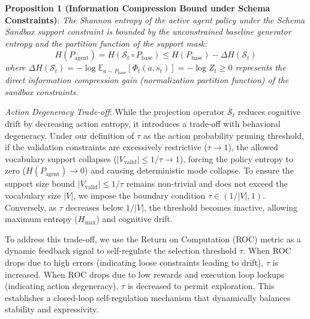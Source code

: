 \documentclass[10pt,journal,compsoc]{IEEEtran}
\begin{document}
\textbf{Proposition 1 (Information Compression Bound under Schema Constraints)}: \textit{The Shannon entropy of the active agent policy under the Schema Sandbox support constraint is bounded by the unconstrained baseline generator entropy and the partition function of the support mask:}
\begin{equation}
H(P_{\text{agent}}) = H(\mathcal{S}_t \circ P_{\text{base}}) \le H(P_{\text{base}}) - \Delta H(\mathcal{S}_t)
\end{equation}
\textit{where $\Delta H(\mathcal{S}_t) = -\log \mathbb{E}_{a \sim P_{\text{base}}}[\Phi_t(a, s_t)] = -\log Z_t \ge 0$ represents the direct information compression gain (normalization partition function) of the sandbox constraints.}

\textit{Action Degeneracy Trade-off}: While the projection operator $\mathcal{S}_t$ reduces cognitive drift by decreasing action entropy, it introduces a trade-off with behavioral degeneracy. Under our definition of $\tau$ as the action probability pruning threshold, if the validation constraints are excessively restrictive ($\tau \to 1$), the allowed vocabulary support collapses ($|V_{\text{valid}}| \le 1/\tau \to 1$), forcing the policy entropy to zero ($H(P_{\text{agent}}) \to 0$) and causing deterministic mode collapse. To ensure the support size bound $|V_{\text{valid}}| \le 1/\tau$ remains non-trivial and does not exceed the vocabulary size $|V|$, we impose the boundary condition $\tau \in (1/|V|, 1)$. Conversely, as $\tau$ decreases below $1/|V|$, the threshold becomes inactive, allowing maximum entropy ($H_{\max}$) and cognitive drift.

To address this trade-off, we use the Return on Computation (ROC) metric as a dynamic feedback signal to self-regulate the selection threshold $\tau$. When ROC drops due to high errors (indicating loose constraints leading to drift), $\tau$ is increased. When ROC drops due to low rewards and execution loop lockups (indicating action degeneracy), $\tau$ is decreased to permit exploration. This establishes a closed-loop self-regulation mechanism that dynamically balances stability and expressivity.
\end{document}
